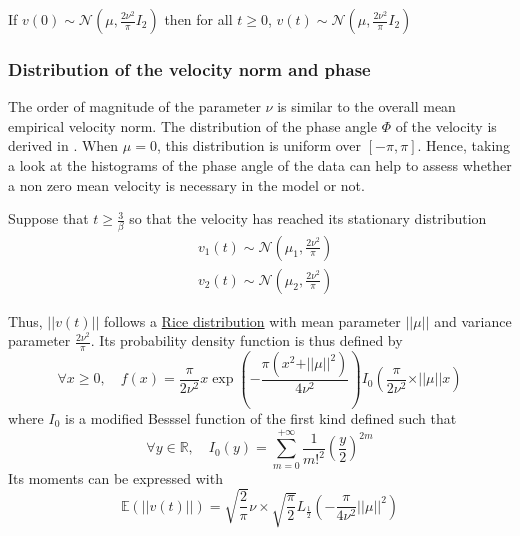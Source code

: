 \documentclass[11pt]{article}
\newcommand {\R}{\mathbb{R}}
\newcommand {\E}{\mathbb{E}}
\newcommand {\1}{\mathbb{1}}
\begin{document}
If $v(0) \sim \mathcal{N}\left(\mu,\frac{2\nu^2}{\pi} I_2\right)$ then for all $t \geq 0$, $v(t) \sim \mathcal{N}\left(\mu,\frac{2\nu^2}{\pi} I_2\right)$

\subsubsection{Distribution of the velocity norm and phase}
 The order of magnitude of the parameter $\nu$ is similar to the overall mean empirical velocity norm. The distribution of the phase angle $\Phi$ of the velocity is derived in \cite{pawula_distribution_1982}.
When $\mu=0$, this distribution is uniform over $[-\pi,\pi]$. Hence, taking a look at the histograms of the phase angle of the data can help to assess whether a non zero mean velocity is necessary in the model or not.

Suppose that $t\geq \frac{3}{\beta}$ so that the velocity has reached its stationary distribution
\begin{align*}
	&v_1(t) \sim \mathcal{N}\left(\mu_1, \frac{2\nu^2}{\pi}\right) \\
	&v_2(t) \sim \mathcal{N}\left(\mu_2, \frac{2\nu^2}{\pi}\right)
\end{align*}

\begin{figure}[H]
	\centering
\end{figure}
Thus, $ \vert \vert v(t) \vert \vert$ follows a \href{https://en.wikipedia.org/wiki/Rice_distribution}{Rice distribution} with mean parameter $\vert \vert \mu \vert \vert$ and variance parameter $\frac{2\nu^2}{\pi}$. Its probability density function is thus defined by
\[\forall x \geq 0, \quad f(x)= \frac{\pi}{2\nu^2}x \exp\left(-\frac{\pi (x^2+ \vert \vert \mu \vert \vert^2)}{4\nu^2}\right) I_{0}\left(   \frac{\pi}{2\nu^2}\times \vert \vert \mu \vert \vert x \right)\]
where $I_0$ is a modified Besssel function of the first kind defined such that 
\[\forall y  \in \R, \quad I_0(y)=\sum_{m=0}^{+\infty} \frac{1}{m!^2}\left(\frac{y}{2}\right)^{2m}\]
Its moments can be expressed with
\[\E\left(\vert \vert v(t) \vert \vert\right)=\sqrt{\frac{2}{\pi}}\nu \times \sqrt{\frac{\pi}{2}} L_{\frac{1}{2}} \left( -\frac{\pi}{4\nu^2} \vert \vert \mu \vert \vert ^2 \right)\]
\end{document}
